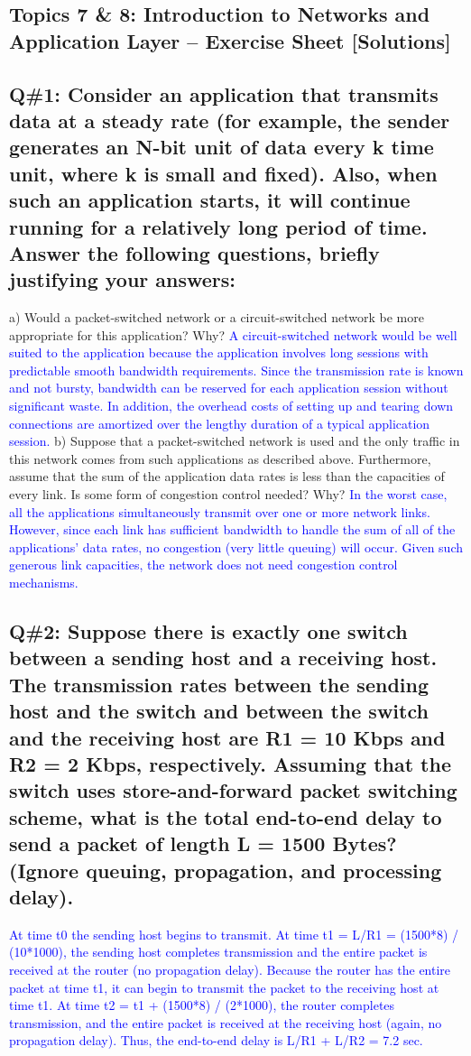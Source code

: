 \subsection{Topics 7 \& 8: Introduction to Networks and Application Layer – Exercise Sheet [Solutions]}
\subsection*{Q\#1: Consider an application that transmits data at a steady rate (for example, the sender generates an N-bit unit of data every k time unit, where k is small and fixed). Also, when such an application starts, it will continue running for a relatively long period of time. Answer the following questions, briefly justifying your answers:}
a) Would a packet-switched network or a circuit-switched network be more appropriate for this application? Why?
\newline
\textcolor{blue}{
A circuit-switched network would be well suited to the application because the application involves long sessions with predictable smooth bandwidth requirements. Since the transmission rate is known and not bursty, bandwidth can be reserved for each application session without significant waste. In addition, the overhead costs of setting up and tearing down connections are amortized over the lengthy duration of a typical application session.
}
\newline
b) Suppose that a packet-switched network is used and the only traffic in this network comes from such applications as described above. Furthermore, assume that the sum of the application data rates is less than the capacities of every link. Is some form of congestion control needed? Why?
\newline
\textcolor{blue}{
In the worst case, all the applications simultaneously transmit over one or more network links. However, since each link has sufficient bandwidth to handle the sum of all of the applications’ data rates, no congestion (very little queuing) will occur. Given such generous link capacities, the network does not need congestion control mechanisms.
}
\subsection*{Q\#2: Suppose there is exactly one switch between a sending host and a receiving host. The transmission rates between the sending host and the switch and between the switch and the receiving host are R1 = 10 Kbps and R2 = 2 Kbps, respectively. Assuming that the switch uses store-and-forward packet switching scheme, what is the total end-to-end delay to send a packet of length L = 1500 Bytes? (Ignore queuing, propagation, and processing delay).}
\textcolor{blue}{
At time t0 the sending host begins to transmit. At time t1 = L/R1 = (1500*8) / (10*1000), the sending host completes transmission and the entire packet is received at the router (no propagation delay). Because the router has the entire packet at time t1, it can begin to transmit the packet to the receiving host at time t1. At time t2 = t1 + (1500*8) / (2*1000), the router completes transmission, and the entire packet is received at the receiving host (again, no propagation delay). Thus, the end-to-end delay is L/R1 + L/R2 = 7.2 sec.
}
